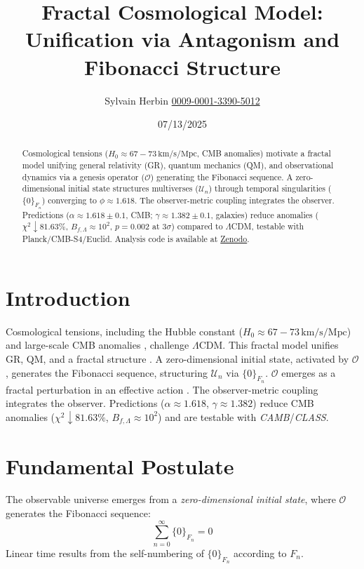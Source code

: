 \documentclass[aps,prl,twocolumn,groupedaddress]{revtex4-2}
\newcommand{\F}[1]{F_{#1}}
\newcommand{\U}[1]{\mathcal{U}_{#1}}
\newcommand{\phiapprox}{\phi \approx 1.618}
\newcommand{\Opp}{\mathcal{O}}
\newcommand{\presets}{\{0\}_{\F{n}}}
\begin{document}
\title{Fractal Cosmological Model: Unification via Antagonism and Fibonacci Structure}
\author{Sylvain Herbin \href{https://orcid.org/0009-0001-3390-5012}{0009-0001-3390-5012}}
\date{07/13/2025}

\begin{abstract}
Cosmological tensions (\(H_0 \approx 67-73 \, \text{km/s/Mpc}\), CMB anomalies) motivate a fractal model unifying general relativity (GR), quantum mechanics (QM), and observational dynamics via a genesis operator (\(\Opp\)) generating the Fibonacci sequence. A zero-dimensional initial state structures multiverses (\(\U{n}\)) through temporal singularities (\(\presets\)) converging to \(\phiapprox\). The observer-metric coupling integrates the observer. Predictions (\(\alpha \approx 1.618 \pm 0.1\), CMB; \(\gamma \approx 1.382 \pm 0.1\), galaxies) reduce anomalies (\(\chi^2 \downarrow 81.63\%\), \(B_{f,\Lambda} \approx 10^2\), \(p = 0.002\) at \(3\sigma\)) compared to \(\Lambda\)CDM, testable with Planck/CMB-S4/Euclid. Analysis code is available at \href{https://zenodo.org}{Zenodo}.
\end{abstract}

\maketitle

\section{Introduction}
Cosmological tensions, including the Hubble constant (\(H_0 \approx 67-73 \, \text{km/s/Mpc}\)) \cite{divalentino2021} and large-scale CMB anomalies \cite{planck}, challenge \(\Lambda\)CDM. This fractal model unifies GR, QM, and a fractal structure \cite{nottale}. A zero-dimensional initial state, activated by \(\Opp\), generates the Fibonacci sequence, structuring \(\U{n}\) via \(\presets\). \(\Opp\) emerges as a fractal perturbation in an effective action \cite{chernsimons}. The observer-metric coupling \cite{zeh,zurek} integrates the observer. Predictions (\(\alpha \approx 1.618\), \(\gamma \approx 1.382\)) reduce CMB anomalies (\(\chi^2 \downarrow 81.63\%\), \(B_{f,\Lambda} \approx 10^2\)) and are testable with \textit{CAMB}/\textit{CLASS}.

\section{Fundamental Postulate}
The observable universe emerges from a \emph{zero-dimensional initial state}, where \(\Opp\) generates the Fibonacci sequence:
\begin{equation}
\sum_{n=0}^\infty \presets = 0
\label{eq:sum_zero}
\end{equation}
Linear time results from the self-numbering of \(\presets\) according to \(\F{n}\).
\end{document}
